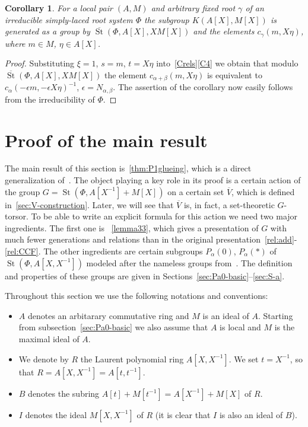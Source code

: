 \documentclass[10pt,a4paper,twoside]{article}
\newtheorem{corollary}[lemma]{Corollary}
\theoremstyle{remark}
\theoremstyle{definition}
\numberwithin{lemma}{section}
\numberwithin{prop}{section}
\numberwithin{corollary}{section}
\numberwithin{externaltheorem}{section}
\DeclareMathOperator{\St}{St}
\newcommand{\inv}{^{-1}}
\numberwithin{equation}{section}
\begin{document}
\begin{corollary} \label{Kgen-strong} For a local pair $(A, M)$ and arbitrary fixed root $\gamma$ of an irreducible simply-laced root system $\Phi$ the subgroup $K(A[X], M[X])$ is generated as a group by $\overline{\St}(\Phi, A[X], XM[X])$ and the elements $c_{\gamma}(m, X\eta)$, where $m \in M$, $\eta \in A[X]$. \end{corollary}
\begin{proof} Substituting $\xi = 1$, $s = m$, $t = X\eta$ into~\cref{Crels}\ref{C4} we obtain that modulo 
 $\overline{\St}(\Phi, A[X], XM[X])$ the element $c_{\alpha + \beta}(m, X\eta)$ is equivalent to $c_{\alpha}(-\epsilon m, -\epsilon X \eta)^{-1}$, $\epsilon = N_{\alpha, \beta}$. The assertion of the corollary now easily follows from the irreducibility of $\Phi$. \end{proof}   

\section{Proof of the main result}
The main result of this section is~\cref{thm:P1glueing}, which is a direct generalization of~\cite[Proposition~4.3]{Tu83}. 
The object playing a key role in its proof is a certain action of the group $G = \St(\Phi, A[X\inv] + M[X])$ on a certain set $\overline{V}$, which is defined in~\cref{sec:V-construction}. Later, we will see that $\overline{V}$ is, in fact, a set-theoretic $G$-torsor.
To be able to write an explicit formula for this action we need two major ingredients. The first one is ~\cref{lemma33}, which gives a presentation of $G$ with much fewer generations and relations than in the original presentation~\eqref{rel:add}-\eqref{rel:CCF}. The other ingredients are certain subgroups $P_\alpha(0)$, $P_\alpha(*)$ of $\St(\Phi, A[X, X\inv])$ modeled after the nameless groups from~\cite[Lemma~3.4]{Tu83}. The definition and properties of these groups are given in Sections~\ref{sec:Pa0-basic}--\ref{sec:S-a}.

Throughout this section we use the following notations and conventions:
\begin{itemize}
 \item $A$ denotes an arbitarary commutative ring and $M$ is an ideal of $A$. Starting from subsection~\ref{sec:Pa0-basic} we also assume that $A$ is local and $M$ is the maximal ideal of $A$.
 \item We denote by $R$ the Laurent polynomial ring $A[X, X^{-1}]$. We set $t = X^{-1}$, so that $R = A[X, X^{-1}] = A[t, t^{-1}]$.
 \item $B$ denotes the subring $A[t] + M[t^{-1}] = A[X^{-1}] + M[X]$ of $R$.
 \item $I$ denotes the ideal $M[X, X^{-1}]$ of $R$ (it is clear that $I$ is also an ideal of $B$).
 \end{itemize}
\end{document}
